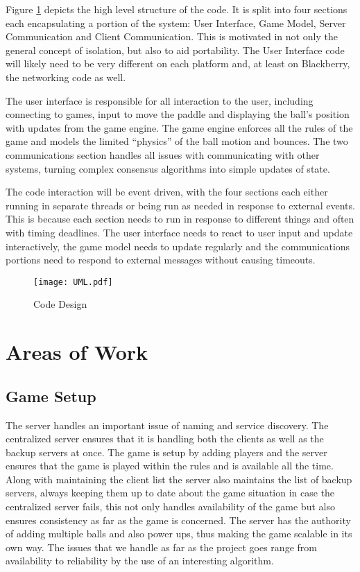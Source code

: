 \documentclass{sig-alternate}
\begin{document}
Figure \ref{code design} depicts the high level structure of the code.  It
is split into four sections each encapsulating a portion of the system:
User Interface, Game Model, Server Communication and Client Communication.
This is motivated in not only the general concept of isolation, but also to
aid portability.  The User Interface code will likely need to be very
different on each platform and, at least on Blackberry, the networking code
as well.

The user interface is responsible for all interaction to the user,
including connecting to games, input to move the paddle and displaying the
ball's position with updates from the game engine.  The game engine
enforces all the rules of the game and models the limited ``physics'' of
the ball motion and bounces.  The two communications section handles all
issues with communicating with other systems, turning complex consensus
algorithms into simple updates of state.

The code interaction will be event driven, with the four sections each
either running in separate threads or being run as needed in response to
external events.  This is because each section needs to run in response to
different things and often with timing deadlines.  The user interface needs
to react to user input and update interactively, the game model needs to
update regularly and the communications portions need to respond to
external messages without causing timeouts.

\begin{figure}[htb]
	\label{code design}
	\begin{center}
		\texttt{[image: UML.pdf]}
		\caption{Code Design}
	\end{center}
\end{figure}

\section{Areas of Work}
\label{areas of work}


\subsection{Game Setup}

The server handles an important issue of naming and service discovery.  The
centralized server ensures  that it is handling both the clients as well as
the backup servers at once. The game is setup by adding players and the
server ensures  that the game is played within the rules and is available
all the time. Along with maintaining the client list the server also
maintains the list of backup servers, always keeping them up to date about
the game situation in case the centralized server fails, this not only
handles availability of the game but also ensures consistency as far as the
game is concerned. The server has the authority of adding multiple balls
and also power ups, thus making the game scalable in its own way. The
issues that we handle as far as the project goes range from availability to
reliability by the use of an interesting algorithm.
\end{document}
